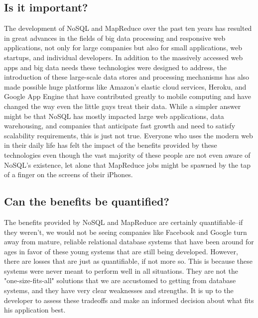 \documentclass[11pt,a4paper]{report}
\begin{document}
\subsection{Is it important?}
The development of NoSQL and MapReduce over the past ten years has resulted in great advances in the fields of big data processing and responsive web applications, not only for large companies but also for small applications, web startups, and individual developers. In addition to the massively accessed web apps and big data needs these technologies were designed to address, the introduction of these large-scale data stores and processing mechanisms has also made possible huge platforms like Amazon's elastic cloud services, Heroku, and Google App Engine that have contributed greatly to mobile computing and have changed the way even the little guys treat their data. While a simpler answer might be that NoSQL has mostly impacted large web applications, data warehousing, and companies that anticipate fast growth and need to satisfy scalability requirements, this is just not true. Everyone who uses the modern web in their daily life has felt the impact of the benefits provided by these technologies even though the vast majority of these people are not even aware of NoSQL's existence, let alone that MapReduce jobs might be spawned by the tap of a finger on the screens of their iPhones. 

\subsection{Can the benefits be quantified?}
The benefits provided by NoSQL and MapReduce are certainly quantifiable--if they weren't, we would not be seeing companies like Facebook and Google turn away from mature, reliable relational database systems that have been around for ages in favor of these young systems that are still being developed. However, there are losses that are just as quantifiable, if not more so. This is because these systems were never meant to perform well in all situations. They are not the "one-size-fits-all" solutions that we are accustomed to getting from database systems, and they have very clear weaknesses and strengths. It is up to the developer to assess these tradeoffs and make an informed decision about what fits his application best.
\end{document}
